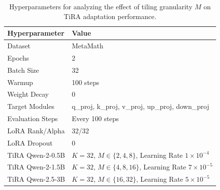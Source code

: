 \documentclass[a4paper,11pt]{article}
\begin{document}
\begin{table}[H]
\centering
\caption{Hyperparameters for analyzing the effect of tiling granularity $M$ on TiRA adaptation performance.}
\begin{tabular}{ll}
\toprule
Hyperparameter & Value \\
\midrule
Dataset & MetaMath \\
Epochs & 2 \\
Batch Size & 32 \\
Warmup & 100 steps \\
Weight Decay & 0 \\
Target Modules & q\_proj, k\_proj, v\_proj, up\_proj, down\_proj \\
Evaluation Steps & Every 100 steps \\
\midrule
LoRA Rank/Alpha & 32/32 \\
LoRA Dropout & 0 \\
\midrule
TiRA Qwen-2-0.5B & $K=32$, $M\in\{2,4,8\}$, Learning Rate $1\times10^{-4}$ \\
TiRA Qwen-2-1.5B & $K=32$, $M\in\{4,8,16\}$, Learning Rate $7\times10^{-5}$ \\
TiRA Qwen-2.5-3B & $K=32$, $M\in\{16,32\}$, Learning Rate $5\times10^{-5}$ \\
\bottomrule
\end{tabular}
\end{table}
\end{document}
